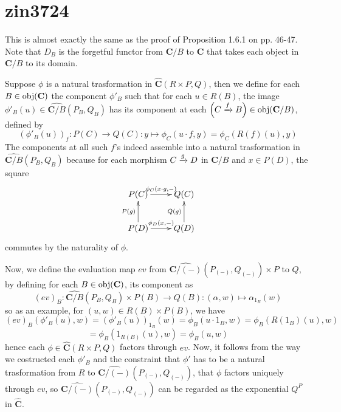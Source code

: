 \section{zin3724}
This is almost exactly the same as the proof of Proposition 1.6.1 on pp. 46-47. Note that $D_B$ is the forgetful functor from $\mathbf C/B$ to $\mathbf C$ that takes each object in $\mathbf C/B$ to its domain.

Suppose $\phi$ is a natural trasformation in $\widehat{\mathbf{C}}(R\times P,Q)$, then we define for each $B\in\operatorname{\operatorname{obj}}(\mathbf C)$ the component $\phi'_B$ such that for each $u\in R(B)$, the image $\phi'_B(u)\in\widehat{\mathbf{C}/B}(P_B,Q_B)$ has its component at each $\left(C\xrightarrow{f}B\right)\in\operatorname{\operatorname{obj}}(\mathbf C/B)$, defined by
\[(\phi'_B(u))_f:P(C)\to Q(C):y\mapsto\phi_C(u\cdot f,y)=\phi_C(R(f)(u),y)\]
The components at all such $f$'s indeed assemble into a natural trasformation in $\widehat{\mathbf{C}/B}(P_B,Q_B)$ because for each morphism $C\xrightarrow{g}D$ in $\mathbf{C}/B$ and $x\in P(D)$, the square
\[\xymatrix{
    P(C) \ar@{->}[r]^{{\phi_C(x\cdot g,-)}} & Q(C) \\
    P(D) \ar@{->}[u]^{P(g)} \ar@{->}[r]^{{\phi_D(x,-)}} & Q(D) \ar@{->}[u]^{Q(g)}
    }\]
commutes by the naturality of $\phi$.

Now, we define the evaluation map $ev$ from $\widehat{\mathbf{C}/(-)}(P_{(-)},Q_{(-)})\times P$ to $Q$, by defining for each $B\in\operatorname{\operatorname{obj}}(\mathbf{C})$, its component as
\[(ev)_B:\widehat{\mathbf{C}/B}(P_B,Q_B)\times P(B)\to Q(B):(\alpha,w)\mapsto\alpha_{1_B}(w)\]
so as an example, for $(u,w)\in R(B)\times P(B)$, we have
\[(ev)_B(\phi'_B(u),w)=(\phi'_B(u))_{1_B}(w)=\phi_B(u\cdot1_B,w)=\phi_B(R(1_B)(u),w)\]
\[=\phi_B(1_{R(B)}(u),w)=\phi_B(u,w)\]
hence each $\phi\in\widehat{\mathbf{C}}(R\times P,Q)$ factors through $ev$. Now, it follows from the way we costructed each $\phi'_B$ and the constraint that $\phi'$ has to be a natural trasformation from $R$ to $\widehat{\mathbf{C}/(-)}(P_{(-)},Q_{(-)})$, that $\phi$ factors uniquely through $ev$, so $\widehat{\mathbf{C}/(-)}(P_{(-)},Q_{(-)})$ can be regarded as the exponential $Q^P$ in $\widehat{\mathbf{C}}$.